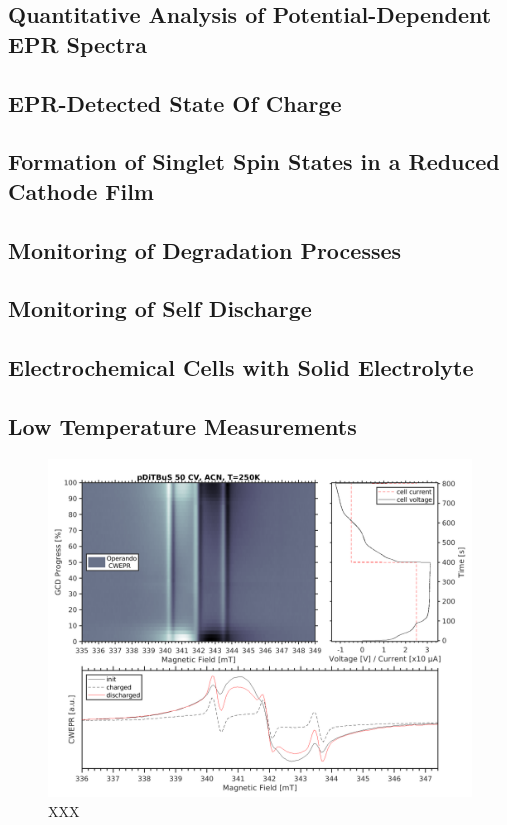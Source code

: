 \subsection{Quantitative Analysis of Potential-Dependent EPR Spectra}

\subsection{EPR-Detected State Of Charge}

\subsection{Formation of Singlet Spin States in a Reduced Cathode Film}

\subsection{Monitoring of Degradation Processes}

\subsection{Monitoring of Self Discharge}

\subsection{Electrochemical Cells with Solid Electrolyte}

\subsection{Low Temperature Measurements}
\begin{figure}[h]
\center
	\includegraphics[width=1\textwidth]{./operando_epr/figures/slowcharge_231117_liquid_250K.pdf}
	\caption{XXX}
	\label{fig:Figure_1}
\end{figure}

